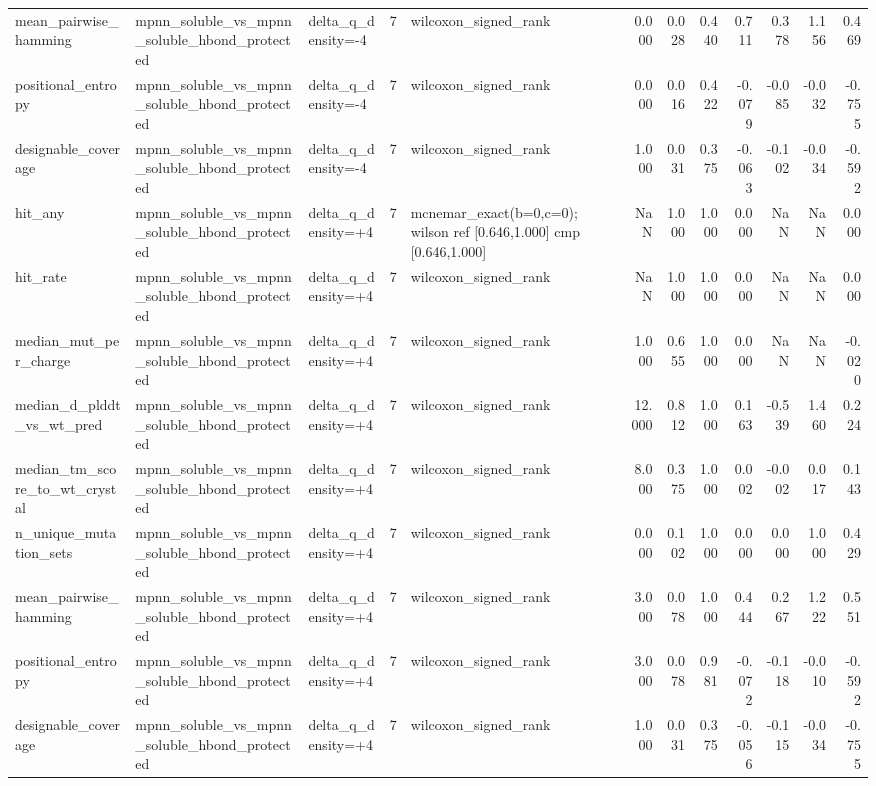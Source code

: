 \begin{table}
{\begin{tabular}{lllrlrrrrrrr}
mean\_pairwise\_hamming & mpnn\_soluble\_vs\_mpnn\_soluble\_hbond\_protected & delta\_q\_density=-4 & 7 & wilcoxon\_signed\_rank & 0.000 & 0.028 & 0.440 & 0.711 & 0.378 & 1.156 & 0.469 \\
positional\_entropy & mpnn\_soluble\_vs\_mpnn\_soluble\_hbond\_protected & delta\_q\_density=-4 & 7 & wilcoxon\_signed\_rank & 0.000 & 0.016 & 0.422 & -0.079 & -0.085 & -0.032 & -0.755 \\
designable\_coverage & mpnn\_soluble\_vs\_mpnn\_soluble\_hbond\_protected & delta\_q\_density=-4 & 7 & wilcoxon\_signed\_rank & 1.000 & 0.031 & 0.375 & -0.063 & -0.102 & -0.034 & -0.592 \\
hit\_any & mpnn\_soluble\_vs\_mpnn\_soluble\_hbond\_protected & delta\_q\_density=+4 & 7 & mcnemar\_exact(b=0,c=0); wilson ref [0.646,1.000] cmp [0.646,1.000] & NaN & 1.000 & 1.000 & 0.000 & NaN & NaN & 0.000 \\
hit\_rate & mpnn\_soluble\_vs\_mpnn\_soluble\_hbond\_protected & delta\_q\_density=+4 & 7 & wilcoxon\_signed\_rank & NaN & 1.000 & 1.000 & 0.000 & NaN & NaN & 0.000 \\
median\_mut\_per\_charge & mpnn\_soluble\_vs\_mpnn\_soluble\_hbond\_protected & delta\_q\_density=+4 & 7 & wilcoxon\_signed\_rank & 1.000 & 0.655 & 1.000 & 0.000 & NaN & NaN & -0.020 \\
median\_d\_plddt\_vs\_wt\_pred & mpnn\_soluble\_vs\_mpnn\_soluble\_hbond\_protected & delta\_q\_density=+4 & 7 & wilcoxon\_signed\_rank & 12.000 & 0.812 & 1.000 & 0.163 & -0.539 & 1.460 & 0.224 \\
median\_tm\_score\_to\_wt\_crystal & mpnn\_soluble\_vs\_mpnn\_soluble\_hbond\_protected & delta\_q\_density=+4 & 7 & wilcoxon\_signed\_rank & 8.000 & 0.375 & 1.000 & 0.002 & -0.002 & 0.017 & 0.143 \\
n\_unique\_mutation\_sets & mpnn\_soluble\_vs\_mpnn\_soluble\_hbond\_protected & delta\_q\_density=+4 & 7 & wilcoxon\_signed\_rank & 0.000 & 0.102 & 1.000 & 0.000 & 0.000 & 1.000 & 0.429 \\
mean\_pairwise\_hamming & mpnn\_soluble\_vs\_mpnn\_soluble\_hbond\_protected & delta\_q\_density=+4 & 7 & wilcoxon\_signed\_rank & 3.000 & 0.078 & 1.000 & 0.444 & 0.267 & 1.222 & 0.551 \\
positional\_entropy & mpnn\_soluble\_vs\_mpnn\_soluble\_hbond\_protected & delta\_q\_density=+4 & 7 & wilcoxon\_signed\_rank & 3.000 & 0.078 & 0.981 & -0.072 & -0.118 & -0.010 & -0.592 \\
designable\_coverage & mpnn\_soluble\_vs\_mpnn\_soluble\_hbond\_protected & delta\_q\_density=+4 & 7 & wilcoxon\_signed\_rank & 1.000 & 0.031 & 0.375 & -0.056 & -0.115 & -0.034 & -0.755 \\

\end{tabular}}
\end{table}
